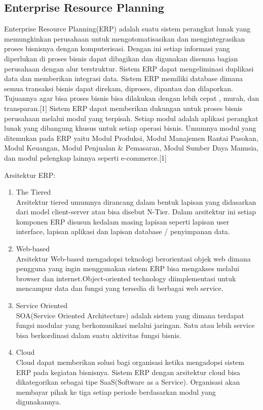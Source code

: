 \subsection{Enterprise Resource Planning}
Enterprise Resource Planning(ERP) adalah suatu sistem perangkat lunak yang memungkinkan perusahaan untuk mengotomatisasikan dan mengintegrasikan proses bisnisnya dengan komputerisasi. Dengan ini setiap informasi yang diperlukan di proses bisnis dapat dibagikan dan digunakan disemua bagian perusahaan dengan alur terstruktur. Sistem ERP dapat mengeliminasi duplikasi data dan memberikan integrasi data. Sistem ERP memiliki database dimana semua transaksi bisnis dapat direkam, diproses, dipantau dan dilaporkan. Tujuannya agar bisa proses bisnis bisa dilakukan dengan lebih cepat , murah, dan transparan.[1]
Sistem ERP dapat memberikan dukungan untuk proses bisnis perusahaan melalui modul yang terpisah. Setiap modul adalah aplikasi perangkat lunak yang dibangung khusus untuk setiap operasi bisnis. Umumnya modul yang ditemukan pada ERP yaitu Modul Produksi, Modul Manajemen Rantai Pasokan, Modul Keuangan, Modul Penjualan \& Pemasaran, Modul Sumber Daya Manusia, dan modul pelengkap lainnya seperti e-commerce.[1]

Arsitektur ERP: 
\begin{enumerate}[leftmargin=1.3cm]
	\item The Tiered\\
	Arsitektur tiered umumnya dirancang dalam bentuk lapisan yang didasarkan dari model client-server atau bisa disebut N-Tier. Dalam arsitektur ini setiap komponen ERP disusun kedalam masing lapisan seperti lapisan user interface, lapisan aplikasi dan lapisan database / penyimpanan data.
	\item Web-based\\
	Arsitektur Web-based mengadopsi teknologi berorientasi objek web dimana pengguna yang ingin menggunakan sistem ERP bisa mengakses melalui browser dan internet.Object-oriented technology diimplementasi untuk mencampur data dan fungsi yang tersedia di berbagai web service.
	\item Service Oriented\\
	SOA(Service Oriented Architecture) adalah sistem yang dimana terdapat fungsi  modular yang berkomunikasi melalui jaringan. Satu atau lebih service bisa berkordinasi dalam suatu aktivitas fungsi bisnis. 
	\item Cloud\\
	Cloud dapat memberikan solusi bagi organisasi ketika mengadopsi sistem ERP pada kegiatan bisnisnya. Sistem ERP dengan arsitektur cloud bisa dikategorikan sebagai tipe SaaS(Software as a Service). Organisasi akan membayar pihak ke tiga setiap periode berdasarkan modul yang digunakannya. 
\end{enumerate}

